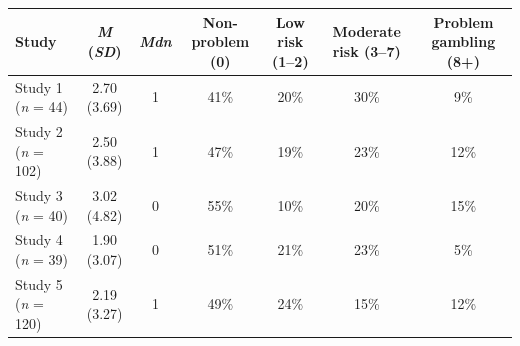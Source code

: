 \begin{tabular}{lcccccc}
\toprule
Study & \textit{M} (\textit{SD}) & \textit{Mdn} & Non-problem (0) & Low risk (1--2) & Moderate risk (3--7) & Problem gambling (8+) \\
\midrule
Study 1 (\textit{n} = 44) & 2.70 (3.69) & 1 & 41\% & 20\% & 30\% & 9\% \\
Study 2 (\textit{n} = 102) & 2.50 (3.88) & 1 & 47\% & 19\% & 23\% & 12\% \\
Study 3 (\textit{n} = 40) & 3.02 (4.82) & 0 & 55\% & 10\% & 20\% & 15\% \\
Study 4 (\textit{n} = 39) & 1.90 (3.07) & 0 & 51\% & 21\% & 23\% & 5\% \\
Study 5 (\textit{n} = 120) & 2.19 (3.27) & 1 & 49\% & 24\% & 15\% & 12\% \\
\bottomrule
\end{tabular}
